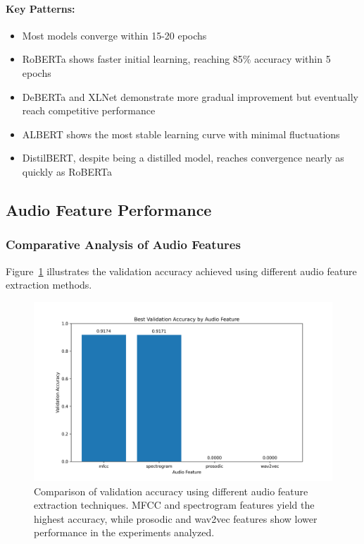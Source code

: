 \documentclass[12pt]{article}
\begin{document}
\paragraph{Key Patterns:}
\begin{itemize}
    \item Most models converge within 15-20 epochs
    \item RoBERTa shows faster initial learning, reaching 85\% accuracy within 5 epochs
    \item DeBERTa and XLNet demonstrate more gradual improvement but eventually reach competitive performance
    \item ALBERT shows the most stable learning curve with minimal fluctuations
    \item DistilBERT, despite being a distilled model, reaches convergence nearly as quickly as RoBERTa
\end{itemize}

\subsection{Audio Feature Performance}
\subsubsection{Comparative Analysis of Audio Features}
Figure~\ref{fig:audio_comparison} illustrates the validation accuracy achieved using different audio feature extraction methods. 

\begin{figure}[h]
    \centering
    \includegraphics[width=0.9\linewidth]{Figures/audio_feature_comparison.png}
    \caption{Comparison of validation accuracy using different audio feature extraction techniques. MFCC and spectrogram features yield the highest accuracy, while prosodic and wav2vec features show lower performance in the experiments analyzed.}
    \label{fig:audio_comparison}
\end{figure}
\end{document}
